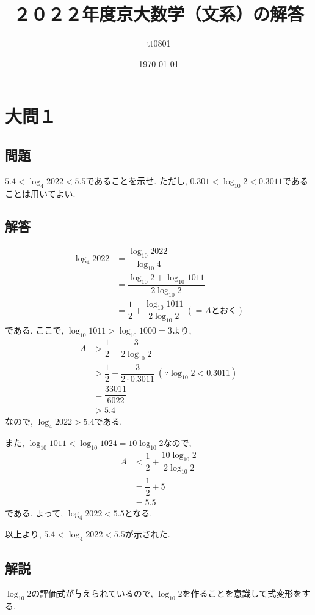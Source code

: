 \documentclass[dvipdfmx,a4paper]{jsarticle}
\title{２０２２年度京大数学（文系）の解答}
\author{tt0801}
\date{\today}
\begin{document}
    \maketitle
    \section{大問１}
    \subsection{問題}
    $5.4 < \log_4 2022 < 5.5$であることを示せ. ただし, $0.301 < \log_{10} 2 < 0.3011$であることは用いてよい. 


    \subsection{解答}
    \begin{align*}
        \log_4 2022 &= \dfrac{\log_{10} 2022}{\log_{10} 4} \\
            &= \dfrac{\log_{10} 2 + \log_{10} 1011}{2\log_{10} 2} \\
            &= \dfrac{1}{2} + \dfrac{\log_{10} 1011}{2\log_{10} 2} \ (=A \mathrm{とおく})
    \end{align*}
    である. ここで, $\log_{10} 1011 > \log_{10} 1000 = 3$より, 
    \begin{align*}
        A & > \dfrac{1}{2} + \dfrac{3}{2\log_{10} 2} \\
        & > \dfrac{1}{2} + \dfrac{3}{2\cdot 0.3011} \ (\because \log_{10} 2 < 0.3011)\\
        &= \dfrac{33011}{6022} \\
        &> 5.4
    \end{align*}
    なので, $\log_4 2022 > 5.4$である. 
    
    また, $\log_{10} 1011 < \log_{10} 1024 = 10 \log_{10} 2$なので, 
    \begin{align*}
        A & < \dfrac{1}{2} + \dfrac{10 \log_{10} 2}{2\log_{10} 2} \\
        &= \dfrac{1}{2} + 5\\
        &= 5.5
    \end{align*}
    である. よって, $\log_4 2022 < 5.5$となる. 

    以上より, $5.4 < \log_4 2022 < 5.5$が示された. 


    \subsection{解説}
    $\log_{10} 2$の評価式が与えられているので, $\log_{10} 2$を作ることを意識して式変形をする. 
\end{document}
